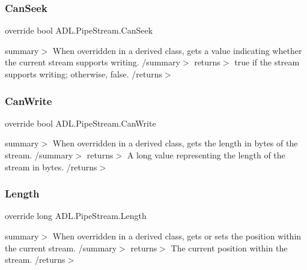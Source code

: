 \subsubsection{\texorpdfstring{Can\+Seek}{CanSeek}}
{\footnotesize\ttfamily override bool A\+D\+L.\+Pipe\+Stream.\+Can\+Seek\hspace{0.3cm}{\ttfamily [get]}}

summary$>$ When overridden in a derived class, gets a value indicating whether the current stream supports writing. /summary$>$ returns$>$ true if the stream supports writing; otherwise, false. /returns$>$ \mbox{\label{class_a_d_l_1_1_pipe_stream_a24b173b85db2cb2c76c8688086e6aebb}} 
\subsubsection{\texorpdfstring{Can\+Write}{CanWrite}}
{\footnotesize\ttfamily override bool A\+D\+L.\+Pipe\+Stream.\+Can\+Write\hspace{0.3cm}{\ttfamily [get]}}

summary$>$ When overridden in a derived class, gets the length in bytes of the stream. /summary$>$ returns$>$ A long value representing the length of the stream in bytes. /returns$>$ \mbox{\label{class_a_d_l_1_1_pipe_stream_a4c9f83e98008f203c5535ad730ca0614}} 
\subsubsection{\texorpdfstring{Length}{Length}}
{\footnotesize\ttfamily override long A\+D\+L.\+Pipe\+Stream.\+Length\hspace{0.3cm}{\ttfamily [get]}}

summary$>$ When overridden in a derived class, gets or sets the position within the current stream. /summary$>$ returns$>$ The current position within the stream. /returns$>$ \mbox{\label{class_a_d_l_1_1_pipe_stream_a250f42c7da667f60487068e27c3d67d0}} 
